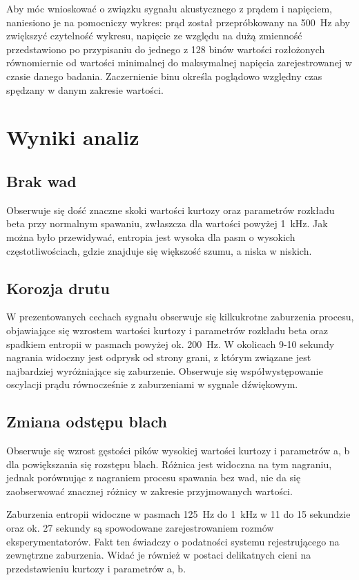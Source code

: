 \documentclass{mwart}
\begin{document}
Aby móc wnioskować o związku sygnału akustycznego z prądem i napięciem, naniesiono je na pomocniczy wykres: prąd został przepróbkowany na 500~Hz aby zwiększyć czytelność wykresu, napięcie ze względu na dużą zmienność przedstawiono po przypisaniu do jednego z 128 binów wartości rozłożonych równomiernie od wartości minimalnej do maksymalnej napięcia zarejestrowanej w czasie danego badania. Zaczernienie binu określa poglądowo względny czas spędzany w danym zakresie wartości.

\section{Wyniki analiz}
	\subsection{Brak wad}
	Obserwuje się dość znaczne skoki wartości kurtozy oraz parametrów rozkładu beta przy normalnym spawaniu, zwłaszcza dla wartości powyżej 1~kHz. Jak można było przewidywać, entropia jest wysoka dla pasm o wysokich częstotliwościach, gdzie znajduje się większość szumu, a niska w niskich. 
	
	
    \subsection{Korozja drutu}
    W prezentowanych cechach sygnału obserwuje się kilkukrotne zaburzenia procesu, objawiające się wzrostem wartości kurtozy i parametrów rozkładu beta oraz spadkiem entropii w pasmach powyżej ok. 200~Hz.
    W okolicach 9-10 sekundy nagrania widoczny jest odprysk od strony grani, z którym związane jest najbardziej wyróżniające się zaburzenie. 
    Obserwuje się współwystępowanie oscylacji prądu równocześnie z zaburzeniami w sygnale dźwiękowym.
	
	
	\subsection{Zmiana odstępu blach}
Obserwuje się wzrost gęstości pików wysokiej wartości kurtozy i parametrów a, b dla powiększania się rozstępu blach. Różnica jest widoczna na tym nagraniu, jednak porównując z nagraniem procesu spawania bez wad, nie da się zaobserwować znacznej różnicy w zakresie przyjmowanych wartości.

Zaburzenia  entropii widoczne w pasmach 125~Hz do 1~kHz w 11 do 15 sekundzie oraz ok. 27 sekundy są spowodowane zarejestrowaniem rozmów eksperymentatorów. Fakt ten świadczy o podatności systemu rejestrującego na zewnętrzne zaburzenia. Widać je również w postaci delikatnych cieni na przedstawieniu kurtozy i parametrów a, b.
	
	
\end{document}
